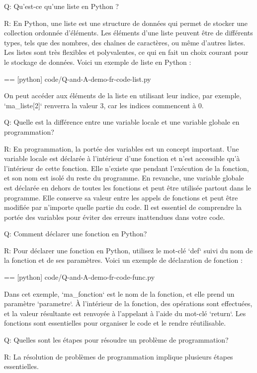 Q:
  Qu'est-ce qu'une liste en Python ?

R:
  En Python, une liste est une structure de données qui permet de stocker une collection ordonnée d'éléments. Les éléments d'une liste peuvent être de différents types, tels que des nombres, des chaînes de caractères, ou même d'autres listes. Les listes sont très flexibles et polyvalentes, ce qui en fait un choix courant pour le stockage de données. Voici un exemple de liste en Python :

  == [python] {code/Q-and-A-demo-fr-code-list.py}

  On peut accéder aux éléments de la liste en utilisant leur indice, par exemple, `ma\_liste[2]` renverra la valeur 3, car les indices commencent à 0.

Q:
  Quelle est la différence entre une variable locale et une variable globale en programmation?

R:
  En programmation, la portée des variables est un concept important. Une variable locale est déclarée à l'intérieur d'une fonction et n'est accessible qu'à l'intérieur de cette fonction. Elle n'existe que pendant l'exécution de la fonction, et son nom est isolé du reste du programme. En revanche, une variable globale est déclarée en dehors de toutes les fonctions et peut être utilisée partout dans le programme. Elle conserve sa valeur entre les appels de fonctions et peut être modifiée par n'importe quelle partie du code. Il est essentiel de comprendre la portée des variables pour éviter des erreurs inattendues dans votre code.

Q:
  Comment déclarer une fonction en Python?

R:
  Pour déclarer une fonction en Python, utilisez le mot-clé `def` suivi du nom de la fonction et de ses paramètres. Voici un exemple de déclaration de fonction :

  == [python] {code/Q-and-A-demo-fr-code-func.py}

  Dans cet exemple, `ma\_fonction` est le nom de la fonction, et elle prend un paramètre `parametre`. À l'intérieur de la fonction, des opérations sont effectuées, et la valeur résultante est renvoyée à l'appelant à l'aide du mot-clé `return`. Les fonctions sont essentielles pour organiser le code et le rendre réutilisable.

Q:
  Quelles sont les étapes pour résoudre un problème de programmation?

R:
  La résolution de problèmes de programmation implique plusieurs étapes essentielles.

